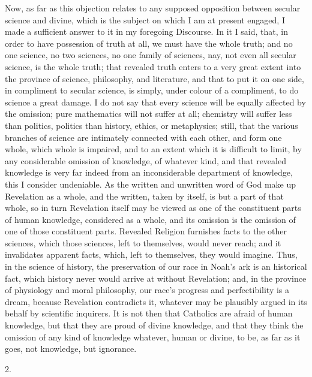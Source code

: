 Now, as far as this objection relates to any supposed opposition
between secular science and divine, which is the subject on which I am
at present engaged, I made a sufficient answer to it in my foregoing
Discourse. In it I said, that, in order to have possession of truth at
all, we must have the whole truth; and no one science, no two
sciences, no one family of sciences, nay, not even all secular
science, is the whole truth; that revealed truth enters to a very
great extent into the province of science, philosophy, and literature,
and that to put it on one side, in compliment to secular science, is
simply, under colour of a compliment, to do science a great damage. I
do not say that every science will be equally affected by the
omission; pure mathematics will not suffer at all; chemistry will
suffer less than politics, politics than history, ethics, or
metaphysics; still, that the various branches of science are
intimately connected with each other, and form one whole, which whole
is impaired, and to an extent which it is difficult to limit, by any
considerable omission of knowledge, of whatever kind, and that
revealed knowledge is very far indeed from an inconsiderable
department of knowledge, this I consider undeniable. As the written
and unwritten word of God make up Revelation as a whole, and the
written, taken by itself, is but a part of that whole, so in turn
Revelation itself may be viewed as one of the constituent parts of
human knowledge, considered as a whole, and its omission is the
omission of one of those constituent parts. Revealed Religion
furnishes facts to the other sciences, which those sciences, left to
themselves, would never reach; and it invalidates apparent facts,
which, left to themselves, they would imagine. Thus, in the science of
history, the preservation of our race in Noah's ark is an historical
fact, which history never would arrive at without Revelation; and, in
the province of physiology and moral philosophy, our race's progress
and perfectibility is a dream, because Revelation contradicts it,
whatever may be plausibly argued in its behalf by scientific
inquirers. It is not then that Catholics are afraid of human
knowledge, but that they are proud of divine knowledge, and that they
think the omission of any kind of knowledge whatever, human or divine,
to be, as far as it goes, not knowledge, but ignorance.

2.

